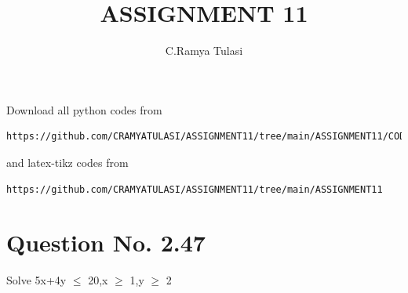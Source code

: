 \documentclass[journal,12pt,twocolumn]{IEEEtran}
\begin{document}
     \def\rightbox#1{\makebox[0in][r]{#1}}
     \def\centbox#1{\makebox[0in]{#1}}
     \def\topbox#1{\raisebox{-\baselineskip}[0in][0in]{#1}}
     \def\midbox#1{\raisebox{-0.5\baselineskip}[0in][0in]{#1}}
\vspace{3cm}
\title{ASSIGNMENT 11}
\author{C.Ramya Tulasi }
\maketitle
\newpage
\bigskip
\renewcommand{\thefigure}{\theenumi}
\renewcommand{\thetable}{\theenumi}
Download all python codes from 
\begin{lstlisting}
https://github.com/CRAMYATULASI/ASSIGNMENT11/tree/main/ASSIGNMENT11/CODES
\end{lstlisting}
%
and latex-tikz codes from 
%
\begin{lstlisting}
https://github.com/CRAMYATULASI/ASSIGNMENT11/tree/main/ASSIGNMENT11
\end{lstlisting}
%
\section{Question No. 2.47}
Solve 5x+4y $\leq$ 20,x $\geq$ 1,y $\geq$ 2
\end{document}
